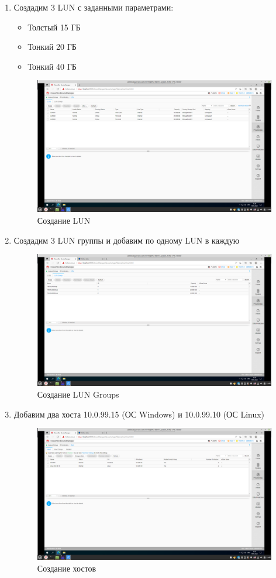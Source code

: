 \documentclass[a4paper,14pt]{extarticle}
\begin{document}
\begin{enumerate}
\item Создадим 3 LUN  с заданными параметрами:
\begin{itemize}
	\item Толстый 15 ГБ
	\item Тонкий 20 ГБ
	\item Тонкий 40 ГБ
\end{itemize}


\begin{figure}[h!]
	\centering
	\includegraphics[width=0.7\linewidth]{"images/7/Снимок экрана от 2022-04-06 16-49-45"}
	\caption{Создание LUN}
	\label{fig:---2022-04-06-16-49-45}
\end{figure}
\newpage
\item Создадим 3 LUN группы и добавим по одному LUN в каждую

\begin{figure}[h!]
	\centering
	\includegraphics[width=0.7\linewidth]{"images/7/Снимок экрана от 2022-04-06 16-51-58"}
	\caption{Создание LUN Groups}
	\label{fig:---2022-04-06-16-51-58}
\end{figure}

\item Добавим два хоста 10.0.99.15 (ОС Windows) и 10.0.99.10 (ОС Linux)

\begin{figure}[h!]
	\centering
	\includegraphics[width=0.7\linewidth]{"images/7/Снимок экрана от 2022-04-06 16-57-24"}
	\caption{Создание хостов}
	\label{fig:---2022-04-06-16-57-24}
\end{figure}


\end{enumerate}
\end{document}
